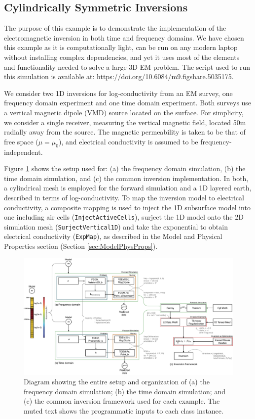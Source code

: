 \documentclass[preprint,review,3p,times,onecolumn,authoryear]{elsarticle}
\begin{document}
\subsection{Cylindrically Symmetric Inversions}
\label{sec:CylindricallySymmetricInversions}

The purpose of this example is to demonstrate the implementation of the
electromagnetic inversion in both time and frequency domains. We have chosen
this example as it is computationally light, can be run on any modern
laptop without installing complex dependencies, and yet it uses most of the
elements and functionality needed to solve a large 3D EM problem. The script used to
run this simulation is available at: https://doi.org/10.6084/m9.figshare.5035175.

We consider two 1D inversions for log-conductivity from an EM survey, one
frequency domain experiment and one time domain experiment. Both surveys use a
vertical magnetic dipole (VMD) source located on the surface. For simplicity,
we consider a single receiver, measuring the vertical magnetic field, located 50m
radially away from the source. The magnetic permeability is taken to be that of free space ($\mu = \mu_0$), and electrical conductivity is assumed to be frequency-independent.

Figure \ref{fig:example1structure} shows the setup used for: (a) the frequency
domain simulation, (b) the time domain simulation, and (c) the common
inversion implementation. In both, a cylindrical mesh is employed for the
forward simulation and a 1D layered earth, described in terms of
log-conductivity. To map the inversion model to electrical
conductivity, a composite mapping is used to inject the 1D subsurface model
into one including air cells (\texttt{InjectActiveCells}), surject the 1D
model onto the 2D simulation mesh (\texttt{SurjectVertical1D}) and take the
exponential to obtain electrical conductivity (\texttt{ExpMap}), as described
in the Model and Physical Properties section (Section \ref{sec:ModelPhysProps}).

{%
\begin{figure}[htb!]
    \centering
    \includegraphics[width=\textwidth]{images/simpegEMexamples-03.png}
\caption{Diagram showing the entire setup and organization of (a) the frequency domain simulation; (b) the time domain simulation; and (c) the common inversion framework used for each example. The muted text shows the programmatic inputs to each class instance.}
 \label{fig:example1structure}
\end{figure}
}
\end{document}
